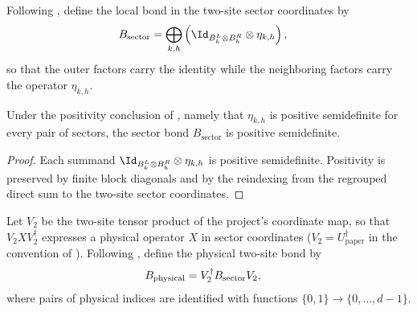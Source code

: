 \begin{definition}
    \label{def:mpdo_physical_sector_two_site_bond}
    \leanok
    Following
    \cite[Appendix~C.2, Proposition~C.8, lines~1581--1593]
    {Cirac2016MPDO_arXiv}, define the local bond in the two-site sector
    coordinates by
    \begin{align}
        B_{\mathrm{sector}}
         & =\bigoplus_{k,h}
        \left(\Id_{B_k^L\otimes B_h^R}\otimes\eta_{k,h}\right),
        \notag
    \end{align}
    so that the outer factors carry the identity while the neighboring factors
    carry the operator $\eta_{k,h}$.
\end{definition}

\begin{lemma}
    \label{thm:mpdo_physical_sector_two_site_bond_pos}
    \leanok
    Under the positivity conclusion of
    \cite[Appendix~C.2, lines~1446--1450]{Cirac2016MPDO_arXiv}, namely that
    $\eta_{k,h}$ is positive semidefinite for every pair of sectors, the sector
    bond $B_{\mathrm{sector}}$ is positive semidefinite.
\end{lemma}

\begin{proof}
    \leanok
    Each summand
    $\Id_{B_k^L\otimes B_h^R}\otimes\eta_{k,h}$ is positive semidefinite.
    Positivity is preserved by finite block diagonals and by the reindexing
    from the regrouped direct sum to the two-site sector coordinates.
\end{proof}

\begin{definition}
    \label{def:mpdo_physical_two_site_bond}
    \leanok
    Let $V_2$ be the two-site tensor product of the project's coordinate map,
    so that $V_2XV_2^\dagger$ expresses a physical operator $X$ in sector
    coordinates ($V_2=U_{\mathrm{paper}}^\dagger$ in the convention of
    \cite[Appendix~C.2, lines~1581--1583]{Cirac2016MPDO_arXiv}). Following
    \cite[Appendix~C.2, Proposition~C.8, lines~1581--1593]
    {Cirac2016MPDO_arXiv}, define the physical two-site bond by
    \begin{align}
        B_{\mathrm{physical}}
         & =V_2^\dagger B_{\mathrm{sector}}V_2,
        \notag
    \end{align}
    where pairs of physical indices are identified with functions
    $\{0,1\}\to\{0,\ldots,d-1\}$.
\end{definition}


